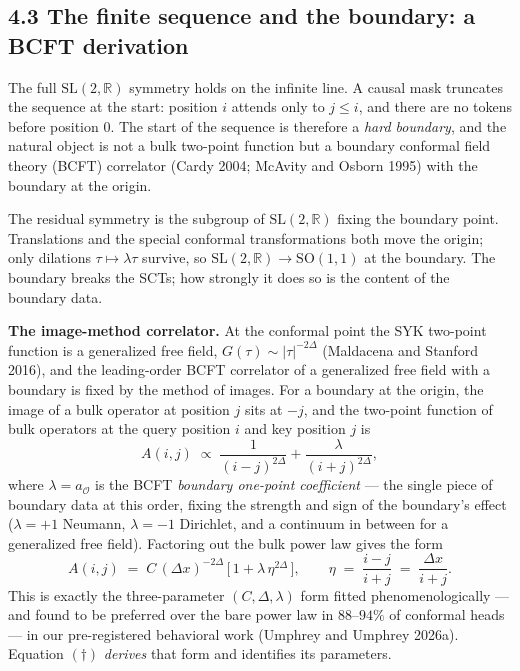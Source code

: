 \subsection{4.3 The finite sequence and the boundary: a BCFT
derivation}\label{the-finite-sequence-and-the-boundary-a-bcft-derivation}

The full \(\mathrm{SL}(2,\mathbb{R})\) symmetry holds on the infinite
line. A causal mask truncates the sequence at the start: position \(i\)
attends only to \(j \le i\), and there are no tokens before position
\(0\). The start of the sequence is therefore a \emph{hard boundary},
and the natural object is not a bulk two-point function but a boundary
conformal field theory (BCFT) correlator (Cardy 2004; McAvity and Osborn
1995) with the boundary at the origin.

The residual symmetry is the subgroup of \(\mathrm{SL}(2,\mathbb{R})\)
fixing the boundary point. Translations and the special conformal
transformations both move the origin; only dilations \(\tau \mapsto
\lambda\tau\) survive, so
\(\mathrm{SL}(2,\mathbb{R}) \to \mathrm{SO}(1,1)\) at the boundary. The
boundary breaks the SCTs; how strongly it does so is the content of the
boundary data.

\textbf{The image-method correlator.} At the conformal point the SYK
two-point function is a generalized free field,
\(G(\tau) \sim |\tau|^{-2\Delta}\) (Maldacena and Stanford 2016), and
the leading-order BCFT correlator of a generalized free field with a
boundary is fixed by the method of images. For a boundary at the origin,
the image of a bulk operator at position \(j\) sits at \(-j\), and the
two-point function of bulk operators at the query position \(i\) and key
position \(j\) is \[
A(i,j) \;\propto\; \frac{1}{(i-j)^{2\Delta}}
                 + \frac{\lambda}{(i+j)^{2\Delta}},
\] where \(\lambda = a_{\mathcal O}\) is the BCFT \emph{boundary
one-point coefficient} --- the single piece of boundary data at this
order, fixing the strength and sign of the boundary's effect
(\(\lambda = +1\) Neumann, \(\lambda = -1\) Dirichlet, and a continuum
in between for a generalized free field). Factoring out the bulk power
law gives the form \[
\boxed{\,A(i,j) \;=\; C\,(\Delta x)^{-2\Delta}\,
\big[\,1 + \lambda\,\eta^{2\Delta}\,\big],
\qquad \eta \;=\; \frac{i-j}{i+j} \;=\; \frac{\Delta x}{i+j}.\,}
\tag{$\dagger$}
\] This is exactly the three-parameter \((C, \Delta, \lambda)\) form
fitted phenomenologically --- and found to be preferred over the bare
power law in \(88\)--\(94\%\) of conformal heads --- in our
pre-registered behavioral work (Umphrey and Umphrey 2026a). Equation
\((\dagger)\) \emph{derives} that form and identifies its parameters.

